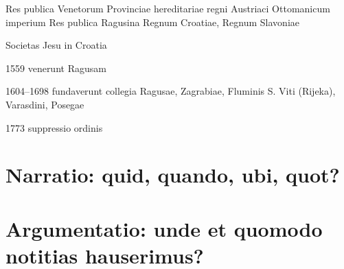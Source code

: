 \documentclass[14pt]{beamer}
\begin{document}
\begin{frame}

  Res publica Venetorum
  Provinciae hereditariae regni Austriaci
  Ottomanicum imperium
  Res publica Ragusina
  Regnum Croatiae, Regnum Slavoniae

\end{frame}


\begin{frame}{Societas Jesu in Croatia}

\alert{1559} venerunt Ragusam

\alert{1604–1698} fundaverunt collegia Ragusae, Zagrabiae, Fluminis S. Viti (Rijeka), Varasdini, Posegae

\alert{1773} suppressio ordinis
\end{frame}

{
    \begin{frame}[plain]
    \end{frame}
    }



\section{Narratio: quid, quando, ubi, quot?}




\section{Argumentatio: unde et quomodo notitias hauserimus?}
\end{document}
